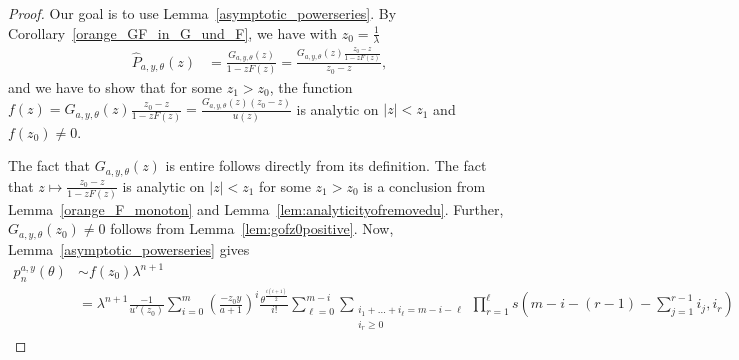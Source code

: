 \documentclass[12pt]{article}
\newcommand{\1}{\mathds{1}}
\theoremstyle{definition}
\theoremstyle{plain}
\theoremstyle{remark}
\begin{document}
\begin{proof}
    Our goal is to use Lemma~\ref{asymptotic_powerseries}. By Corollary~\ref{orange_GF_in_G_und_F}, we have with $z_0=\frac{1}{\lambda}$
    \begin{align*}
        \hat{P}_{a,y,\theta}(z)&= \frac{G_{a,y,\theta}(z)}{1-zF(z)}=\frac{G_{a,y,\theta}(z)\frac{z_0-z}{1-zF(z)}}{z_0-z},
    \end{align*}
    and we have to show that for some $z_1>z_0$, the function $f(z)=G_{a,y,\theta}(z)\frac{z_0-z}{1-zF(z)}=\frac{G_{a,y,\theta}(z)(z_0-z)}{u(z)}$ is analytic on $|z|<z_1$ and $f(z_0)\neq 0$. 
    
The fact that $G_{a,y,\theta}(z)$ is entire follows directly from its definition. The fact that $z\mapsto \frac{z_0-z}{1-zF(z)}$ is analytic on $|z|<z_1$ for some $z_1>z_0$ is a conclusion from Lemma~\ref{orange_F_monoton} and Lemma~\ref{lem:analyticityofremovedu}.  Further, $G_{a,y,\theta}(z_0)\neq 0$ follows from Lemma~\ref{lem:gofz0positive}. 
Now, Lemma~\ref{asymptotic_powerseries} gives
    \begin{align*}
        p_n^{a,y}(\theta)&\sim f(z_0)\lambda^{n+1}\\&=\lambda^{n+1}\frac{-1}{u'(z_0)}\sum_{i=0}^m\left(\frac{-z_0y}{a+1}\right)^i\frac{\theta^\frac{i(i+1)}{2}}{i!}\sum_{{\ell}=0}^{m-i}\sum_{\substack{i_1+\dots +i_{\ell}= m-i-{\ell}\\i_r\ge 0}}\prod_{r=1}^{\ell}s(m-i-(r-1)-\sum_{j=1}^{r-1}i_j,i_r)

\end{align*}
\end{proof}
\end{document}
